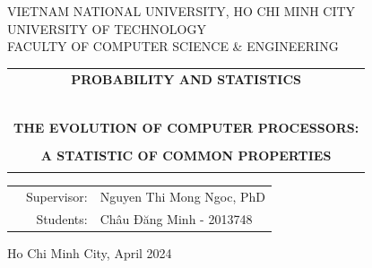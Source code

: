 \documentclass[a4paper]{report}
\begin{document}
\begin{titlepage}
  \begin{center}
    VIETNAM NATIONAL UNIVERSITY, HO CHI MINH CITY\\
    UNIVERSITY OF TECHNOLOGY \\
    FACULTY OF COMPUTER SCIENCE \& ENGINEERING
  \end{center}

  \vspace{1cm}


  \vspace{1cm}


  \begin{center}
    \begin{tabular}{c}
      \textbf{{\Large PROBABILITY AND STATISTICS}}          \\
      ~~                                                    \\
      \hline
      \\
      \textbf{\large THE EVOLUTION OF COMPUTER PROCESSORS:} \\
      \\
      \textbf{\large A STATISTIC OF COMMON PROPERTIES}      \\
      \\
      \hline
    \end{tabular}
  \end{center}

  \vspace{1.5cm}

  \begin{table}[h]
    \begin{tabular}{rrl}
      \hspace{5 cm} & Supervisor: & Nguyen Thi Mong Ngoc, PhD \\

                    & Students:   & Châu Đăng Minh - 2013748
    \end{tabular}
  \end{table}
  \vspace{1.5cm}
  \begin{center}
    {\footnotesize Ho Chi Minh City, April 2024}
  \end{center}
\end{titlepage}

\tableofcontents
\newpage
\listoffigures
\end{document}
